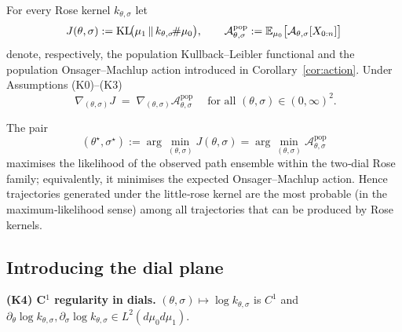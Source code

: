 		\begin{theorem}\label{thm:KL_eq_action}
			For every Rose kernel $k_{\theta,\sigma}$ let
				\[
  					J(\theta,\sigma)
  					:= \mathrm{KL}\!\bigl(\mu_1 \,\Vert\, k_{\theta,\sigma}\!\#\mu_0\bigr),
 			 		\qquad
 					 \mathcal A_{\theta,\sigma}^{\mathrm{pop}}
  					:= \operatorname{\mathbb{E}}_{\mu_0}\bigl[\mathcal A_{\theta,\sigma}[X_{0:n}]\bigr]
				\]
				denote, respectively, the population Kullback–Leibler functional and the
				population Onsager–Machlup action introduced in
				Corollary~\ref{cor:action}.
				Under Assumptions \textnormal{(K0)--(K3)}
				\[
  					\boxed{\;
    					\nabla_{(\theta,\sigma)} J
    					\;=\;
   					\nabla_{(\theta,\sigma)} \mathcal A_{\theta,\sigma}^{\mathrm{pop}}
  					\;}
 	 				\quad\text{for all }(\theta,\sigma)\in(0,\infty)^2.
				\]
		\end{theorem}
		
		\begin{remark}
		The pair
		\[
  			(\theta^{\star},\sigma^{\star})
  			:=\arg\min_{(\theta,\sigma)} J(\theta,\sigma)
 		 	= \arg\min_{(\theta,\sigma)} \mathcal A_{\theta,\sigma}^{\mathrm{pop}}
		\]
		maximises the likelihood of the observed path ensemble within the two‑dial Rose family; 
		equivalently, it minimises the expected Onsager–Machlup action. Hence trajectories 
		generated under the little‑rose kernel are the most probable (in the maximum‑likelihood 
		sense) among all trajectories that can be produced by Rose kernels.
		\end{remark}


 	 \subsection{Introducing the dial plane}
		\begin{assumptionbox}
 			 \textbf{(K4) C$^{1}$ regularity in dials.}
			$(\theta,\sigma)\mapsto\log k_{\theta,\sigma}$ is $C^{1}$ and
			$\partial_\theta\log k_{\theta,\sigma},
			\partial_\sigma\log k_{\theta,\sigma}\in L^{2}(d\mu_0d\mu_1)$.
		\end{assumptionbox}
	
